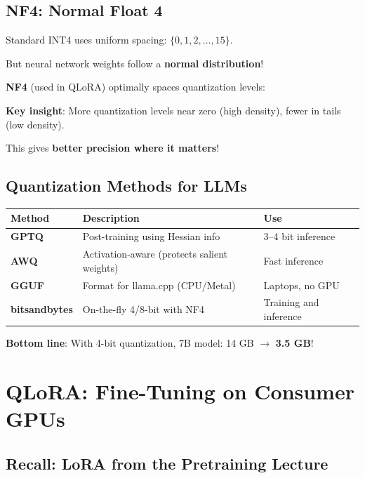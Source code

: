 \documentclass{article}
\begin{document}
\subsection{NF4: Normal Float 4}

Standard INT4 uses uniform spacing: $\{0, 1, 2, \ldots, 15\}$.

But neural network weights follow a \textbf{normal distribution}!

\textbf{NF4} (used in QLoRA) optimally spaces quantization levels:

\begin{center}
\end{center}

\textbf{Key insight}: More quantization levels near zero (high density), fewer in tails (low density).

This gives \textbf{better precision where it matters}!

\subsection{Quantization Methods for LLMs}

\begin{center}
\begin{tabular}{lp{6cm}l}
\toprule
\textbf{Method} & \textbf{Description} & \textbf{Use} \\
\midrule
\textbf{GPTQ} & Post-training using Hessian info & 3--4 bit inference \\
\textbf{AWQ} & Activation-aware (protects salient weights) & Fast inference \\
\textbf{GGUF} & Format for llama.cpp (CPU/Metal) & Laptops, no GPU \\
\textbf{bitsandbytes} & On-the-fly 4/8-bit with NF4 & Training and inference \\
\bottomrule
\end{tabular}
\end{center}

\textbf{Bottom line}: With 4-bit quantization, 7B model: 14 GB $\rightarrow$ \textbf{3.5 GB}!

\section{QLoRA: Fine-Tuning on Consumer GPUs}

\subsection{Recall: LoRA from the Pretraining Lecture}
\end{document}
